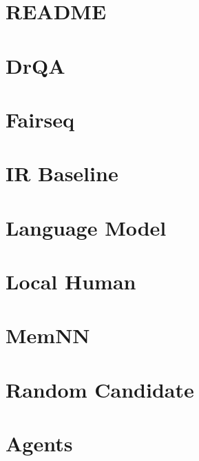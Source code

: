 \documentclass[twoside]{book}
\newcommand{\+}{\discretionary{\mbox{\scriptsize$\hookleftarrow$}}{}{}}
\begin{document}
\chapter{R\+E\+A\+D\+ME}
\label{md_parlai_agents_bert_ranker_README}

\chapter{Dr\+QA}
\label{md_parlai_agents_drqa_README}

\chapter{Fairseq}
\label{md_parlai_agents_fairseq_README}

\chapter{IR Baseline}
\label{md_parlai_agents_ir_baseline_README}

\chapter{Language Model}
\label{md_parlai_agents_language_model_README}

\chapter{Local Human}
\label{md_parlai_agents_local_human_README}

\chapter{Mem\+NN}
\label{md_parlai_agents_memnn_README}

\chapter{Random Candidate}
\label{md_parlai_agents_random_candidate_README}

\chapter{Agents}
\label{md_parlai_agents_README}

\end{document}
